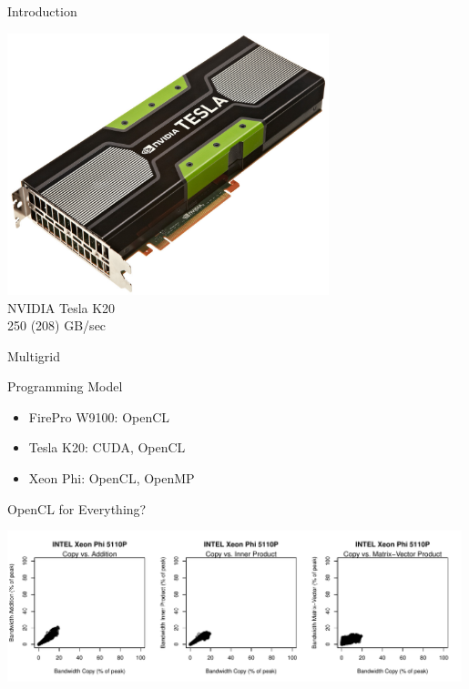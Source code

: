 \begin{frame}{Introduction}
\begin{minipage}{0.3\textwidth}
\begin{center}
    \end{center}
   \end{minipage}
   \hspace{0.2cm}
%
   \begin{minipage}{0.3\textwidth}
    \begin{center}
     \includegraphics[width=0.7\textwidth]{figures/TeslaK20.jpg} \\ NVIDIA Tesla K20 \\ 250 (208) GB/sec
    \end{center}
   \end{minipage}


\end{frame}



\begin{frame}{Multigrid}

 \begin{block}{Programming Model}
  \begin{itemize}
   \item FirePro W9100: OpenCL
   \item Tesla K20: CUDA, OpenCL
   \item Xeon Phi: OpenCL, OpenMP
  \end{itemize}
 \end{block}

 \begin{block}{OpenCL for Everything?}
  \begin{center}
  \includegraphics[width=0.99\textwidth]{figures/xeon_phi_float_xy_copy.pdf}
  \end{center}
 \end{block}

\end{frame}

